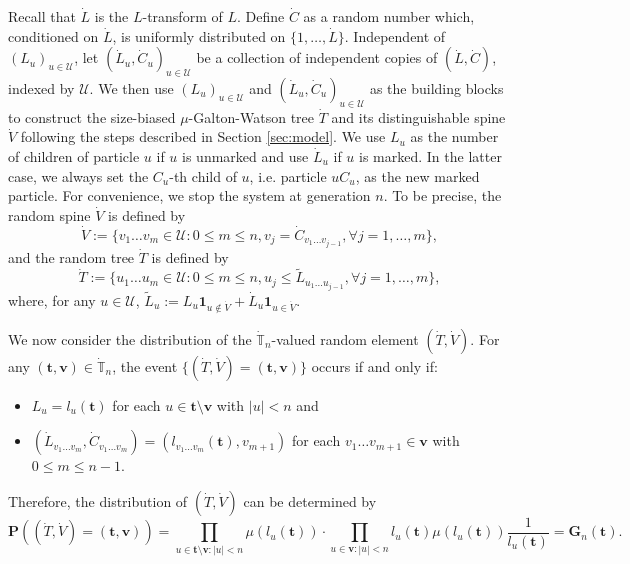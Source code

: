 \documentclass[12pt,a4paper]{amsart}
\numberwithin{equation}{section}
\begin{document}
Recall that $\dot L$ is the $L$-transform of $L$.
	Define $\dot C$ as a random number which, conditioned on $\dot L$, is uniformly distributed on $\{1,\dots,\dot L\}$.
	Independent of $(L_u)_{u\in\mathcal U}$, let $(\dot L_u,\dot C_u)_{u\in \mathcal U}$ be a collection of independent copies of $(\dot L,\dot C)$, indexed by $\mathcal U$.
	We then use $(L_u)_{u\in\mathcal U}$ and $(\dot L_u,\dot C_u)_{u\in\mathcal U}$ as the building blocks to construct the size-biased $\mu$-Galton-Watson tree $\dot T$ and its distinguishable spine $\dot V$ following the steps described in Section \ref{sec:model}.
	We use $L_u$ as the number of children of particle $u$ if $u$ is unmarked and use $\dot L_u$ if $u$ is marked.
	In the latter case, we always set the $C_u$-th child of $u$, i.e. particle $uC_u$, as the new marked particle.
	For convenience, we stop the system at generation $n$. To be precise, the random spine $\dot V$ is defined by
\begin{equation*}
		\dot V
	:=
		\{v_1\dots v_m\in \mathcal U:0\le m\le n, v_j=\dot C_{v_1\dots v_{j-1}},\forall j=1,\dots,m\},
\end{equation*}
	and the random tree $\dot T$ is defined by
\begin{equation*}
		\dot T
	:=
		\{u_1\dots u_m\in\mathcal U: 0\le m\le n,u_j\leq \tilde L_{u_1\dots u_{j-1}},\forall j=1,\dots,m\},
\end{equation*}
	where, for any $u\in\mathcal U$, $\tilde L_u:=L_u\mathbf 1_{u\not\in \dot V}+\dot L_u\mathbf 1_{u\in \dot V}$.

	We now consider the distribution of the $\dot{\mathbb T}_n$-valued random element $(\dot T,\dot V)$.
	For any $( \mathbf t , \mathbf v)\in\dot{\mathbb T}_n$, the event $\{(\dot T,\dot V)=( \mathbf t , \mathbf v)\}$ occurs if and only if:
\begin{itemize}
\item
    $L_u=l_u( \mathbf t )$ for each $u\in  \mathbf t \setminus \mathbf v$ with $| u |<n$ and
\item
	$(\dot L_{v_1\dots v_m},\dot C_{v_1\dots v_m})=(l_{v_1\dots v_m}( \mathbf t ),v_{m+1})$ for each $v_1\dots v_{m+1}\in \mathbf v$ with $0\le m\le n-1$.
\end{itemize}
    Therefore, the distribution of $(\dot T,\dot V)$ can be determined by
\begin{equation}
\label{eq:treespinemeasure}
		\mathbf P((\dot T,\dot V)=( \mathbf t , \mathbf v))
	=
		\prod_{u\in  \mathbf t \setminus \mathbf v:|u|<n}\mu(l_u( \mathbf t ))
	\cdot
		\prod_{u\in  \mathbf v:| u| <n}l_u( \mathbf t )\mu(l_u( \mathbf t ))\frac{1}{l_u( \mathbf t )}
	=
		\mathbf G_n( \mathbf t ).
\end{equation}
	
\end{document}
